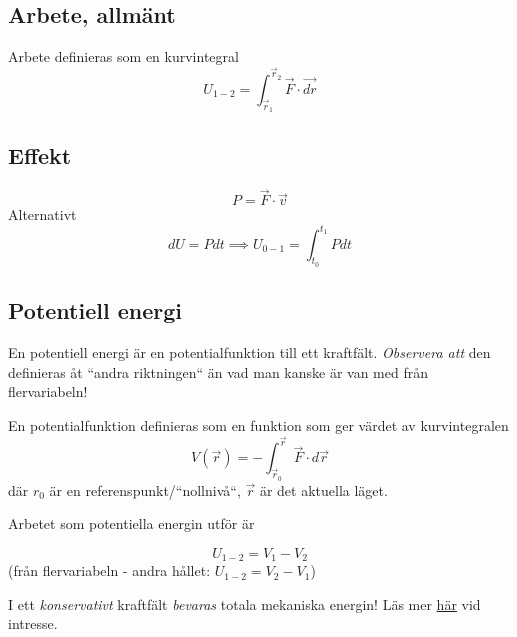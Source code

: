 \documentclass{article}
\newenvironment{ankiflashcard}[1]{}{}
\begin{document}
\begin{paracol}{2}
\subsection{Arbete, allmänt}

\begin{ankiflashcard}{Definiera arbete (generella definitionen)}
Arbete definieras som en kurvintegral
$$
U_{1-2} = \int_{\vec r_1}^{\vec r_2} \vec F \cdot \vec{dr}
$$
\end{ankiflashcard}

\begin{ankiflashcard}{Definiera effekt.}
\subsection{Effekt}
$$P = \vec F \cdot \vec v$$
Alternativt
$$dU = Pdt \implies U_{0-1}=\int_{t_0}^{t_1} P dt$$
\end{ankiflashcard}

\begin{ankiflashcard}{Definiera potentiell energi}
\subsection{Potentiell energi}
En potentiell energi är en potentialfunktion till ett kraftfält. \textit{Observera att} den definieras åt ``andra riktningen`` än vad man kanske är van med från flervariabeln!


En potentialfunktion definieras som en funktion som ger värdet av kurvintegralen
$$
V(\boxed{\vec r}) = \mathbf{-}\int_{\vec r_0}^{\boxed{\vec r}} \vec F \cdot d\vec r 
$$
där $r_0$ är en referenspunkt/``nollnivå``, $\vec r$ är det aktuella läget.

Arbetet som potentiella energin utför är

$$
U_{1-2} = V_1 - V_2
$$
(från flervariabeln - andra hållet: $U_{1-2}=V_2-V_1$)
\end{ankiflashcard}



\begin{ankiflashcard}{Hur förhåller sig totala mekaniska energin i ett konservativt kraftfält?}
I ett \textit{konservativt} kraftfält \textit{bevaras} totala mekaniska energin! Läs mer \href{https://physics-chalmers.github.io/ffm234/doc/pub/08-potentialteori/html/08-potentialteori-bs.html}{här} vid intresse.
\end{ankiflashcard}

\end{paracol}
\end{document}
